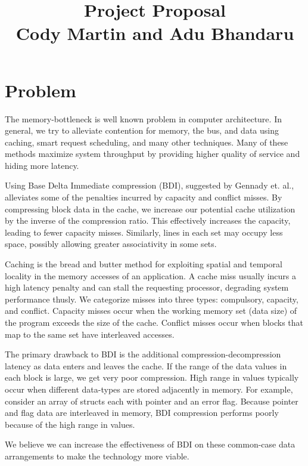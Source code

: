 \documentclass[pageno]{jpaper}
\begin{document}
\title{\textbf{Project Proposal}\\Cody Martin and Adu Bhandaru}

\date{}
\maketitle

\thispagestyle{empty}

\section{Problem}
The memory-bottleneck is well known problem in computer architecture. In general, we try to alleviate contention for memory, the bus, and data using caching, smart request scheduling, and many other techniques. Many of these methods maximize system throughput by providing higher quality of service and hiding more latency.

Using Base Delta Immediate compression (BDI), suggested by Gennady et. al., alleviates some of the penalties incurred by capacity and conflict misses. By compressing block data in the cache, we increase our potential cache utilization by the inverse of the compression ratio. This effectively increases the capacity, leading to fewer capacity misses. Similarly, lines in each set may occupy less space, possibly allowing greater associativity in some sets.

Caching is the bread and butter method for exploiting spatial and temporal locality in the memory accesses of an application. A cache miss usually incurs a high latency penalty and can stall the requesting processor, degrading system performance thusly. We categorize misses into three types: compulsory, capacity, and conflict. Capacity misses occur when the working memory set (data size) of the program exceeds the size of the cache. Conflict misses occur when blocks that map to the same set have interleaved accesses.

The primary drawback to BDI is the additional compression-decompression latency as data enters and leaves the cache. If the range of the data values in each block is large, we get very poor compression. High range in values typically occur when different data-types are stored adjacently in memory. For example, consider an array of structs each with pointer and an error flag. Because pointer and flag data are interleaved in memory, BDI compression performs poorly because of the high range in values.

We believe we can increase the effectiveness of BDI on these common-case data arrangements to make the technology more viable.
\end{document}
